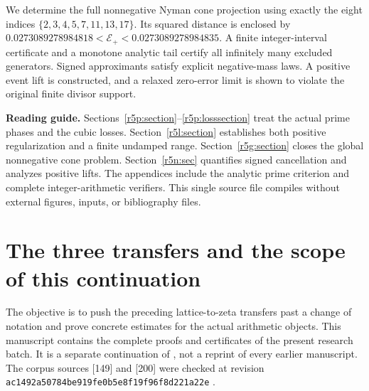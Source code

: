 \documentclass[11pt,a4paper]{article}
\theoremstyle{definition}\newtheorem{definition}[theorem]{Definition}
\theoremstyle{remark}\newtheorem{remark}[theorem]{Remark}
\numberwithin{equation}{section}
\begin{document}
\begin{titlepage}
We determine the full nonnegative Nyman cone projection using
exactly the eight indices $\{2,3,4,5,7,11,13,17\}$.
Its squared distance is enclosed by
$0.0273089278984818<\mathcal E_+<0.0273089278984835$.
A finite integer-interval certificate and a monotone analytic tail
certify all infinitely many excluded generators.
Signed approximants satisfy explicit negative-mass laws.
A positive event lift is constructed, and a relaxed zero-error
limit is shown to violate the original finite divisor support.
\par\endgroup
\vfill
\noindent{}
\end{titlepage}

\tableofcontents
\medskip
\noindent\textbf{Reading guide.}
Sections~\ref{r5p:section}--\ref{r5p:losssection} treat the actual
prime phases and the cubic losses.
Section~\ref{r5l:section} establishes both positive regularization
and a finite undamped range.
Section~\ref{r5g:section} closes the global nonnegative cone problem.
Section~\ref{r5n:sec} quantifies signed cancellation and analyzes
positive lifts.
The appendices include the analytic prime criterion and complete
integer-arithmetic verifiers. This single source file compiles
without external figures, inputs, or bibliography files.
\clearpage

\section{The three transfers and the scope of this continuation}
\label{r5:intro}

The objective is to push the preceding lattice-to-zeta transfers
past a change of notation and prove concrete estimates for the
actual arithmetic objects. This manuscript contains the complete
proofs and certificates of the present research batch. It is a
separate continuation of \cite{TransferZeta}, not a reprint of
every earlier manuscript.
The corpus sources [149] and [200] were checked at revision
\texttt{ac1492a50784be919fe0b5e8f19f96f8d221a22e}
\cite{PrimeCircles,VMRC200}.
\end{document}
